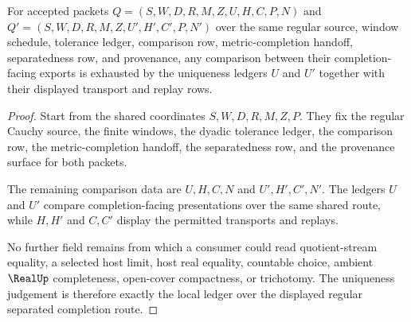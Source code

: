 \begin{theorem}
\label{thm:regular-cauchy-completion-separated-uniqueness-ledger}
For accepted packets $Q=(S,W,D,R,M,Z,U,H,C,P,N)$ and $Q'=(S,W,D,R,M,Z,U',H',C',P,N')$ over the same regular source, window schedule, tolerance ledger, comparison row, metric-completion handoff, separatedness row, and provenance, any comparison between their completion-facing exports is exhausted by the uniqueness ledgers $U$ and $U'$ together with their displayed transport and replay rows.
\end{theorem}
\begin{proof}
Start from the shared coordinates $S,W,D,R,M,Z,P$. They fix the regular Cauchy source, the finite windows, the dyadic tolerance ledger, the comparison row, the metric-completion handoff, the separatedness row, and the provenance surface for both packets.

The remaining comparison data are $U,H,C,N$ and $U',H',C',N'$. The ledgers $U$ and $U'$ compare completion-facing presentations over the same shared route, while $H,H'$ and $C,C'$ display the permitted transports and replays.

No further field remains from which a consumer could read quotient-stream equality, a selected host limit, host real equality, countable choice, ambient $\RealUp$ completeness, open-cover compactness, or trichotomy. The uniqueness judgement is therefore exactly the local ledger over the displayed regular separated completion route.
\end{proof}

\begin{closurestatus}{\RegularCauchyCompletionSeparatedUp}
  \theoryclosure{\seedClosure}
  \formalstatus{\unformalizedV}
\end{closurestatus}
